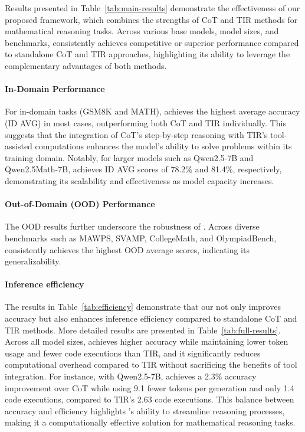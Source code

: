 
Results presented in Table~\ref{tab:main-results} demonstrate the effectiveness of our proposed {\method} framework, which combines the strengths of CoT and TIR methods for mathematical reasoning tasks. 
Across various base models, model sizes, and benchmarks, {\method} consistently achieves competitive or superior performance compared to standalone CoT and TIR approaches, highlighting its ability to leverage the complementary advantages of both methods.

\paragraph{In-Domain Performance}
For in-domain tasks (GSM8K and MATH), {\method} achieves the highest average accuracy (ID AVG) in most cases, outperforming both CoT and TIR individually. This suggests that the integration of CoT's step-by-step reasoning with TIR's tool-assisted computations enhances the model's ability to solve problems within its training domain. Notably, for larger models such as Qwen2.5-7B and Qwen2.5Math-7B, {\method} achieves ID AVG scores of 78.2\% and 81.4\%, respectively, demonstrating its scalability and effectiveness as model capacity increases.

\paragraph{Out-of-Domain (OOD) Performance}
The OOD results further underscore the robustness of {\method}. Across diverse benchmarks such as MAWPS, SVAMP, CollegeMath, and OlympiadBench, {\method} consistently achieves the highest OOD average scores, indicating its generalizability. 


\paragraph{Inference efficiency}
The results in Table~\ref{tab:efficiency} demonstrate that our {\method} not only improves accuracy but also enhances inference efficiency compared to standalone CoT and TIR methods. More detailed results are presented in Table~\ref{tab:full-results}. Across all model sizes, {\method} achieves higher accuracy while maintaining lower token usage and fewer code executions than TIR, and it significantly reduces computational overhead compared to TIR without sacrificing the benefits of tool integration. For instance, with Qwen2.5-7B, {\method} achieves a 2.3\% accuracy improvement over CoT while using 9.1 fewer tokens per generation and only 1.4 code executions, compared to TIR's 2.63 code executions. This balance between accuracy and efficiency highlights {\method}'s ability to streamline reasoning processes, making it a computationally effective solution for mathematical reasoning tasks.

